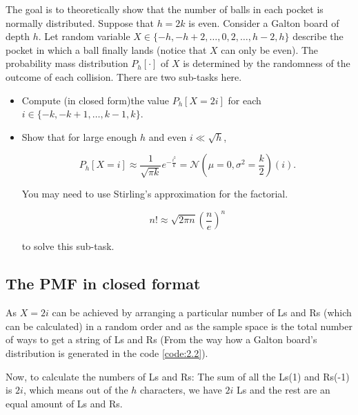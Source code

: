 \begin{tcolorbox}
    The goal is to theoretically show that the number of balls in each pocket is
    normally distributed. Suppose that $h = 2k$ is even. Consider a Galton board
    of depth $h$. Let random variable $X \in \{-h, -h + 2, \ldots, 0, 2, \ldots,
    h - 2, h\}$ describe the pocket in which a ball finally lands (notice that
    $X$ can only be even). The probability mass distribution $P_h[\cdot]$ of $X$
    is determined by the randomness of the outcome of each collision. There are
    two sub-tasks here.
    
    \vspace{10pt}
    \begin{itemize}
        \item Compute (in closed form)the value $P_h[X = 2i]$ for each $i \in \{-
        k, -k + 1, \ldots, k - 1, k\}$.
        \item Show that for large enough $h$ and even $i \ll \sqrt{h}$,
        
            \begin{equation*}
                P_h[X = i] \approx \dfrac{1}{\sqrt{\pi k}}e^{-\frac{i^2}{k}}
                = \mathcal{N}\left(\mu = 0, \sigma^2 = \dfrac{k}{2}\right)(i).
            \end{equation*}

        You may need to use Stirling’s approximation for the factorial.

            \begin{equation*}
                n! \approx \sqrt{2\pi n}\left(\dfrac{n}{e}\right)^n
            \end{equation*}

        to solve this sub-task.
    \end{itemize}
\end{tcolorbox}


\subsection*{The PMF in closed format}

As $X = 2i$ can be achieved by arranging a particular number of Ls and Rs (which
can be calculated) in a random order and as the sample space is the total number
of ways to get a string of Ls and Rs (From the way how a Galton board's
distribution is generated in the code \ref{code:2.2}).

Now, to calculate the numbers of Ls and Rs: The sum of all the Ls(1) and Rs(-1)
is $2i$, which means out of the $h$ characters, we have $2i$ Ls and the rest are
an equal amount of Ls and Rs.

